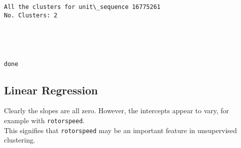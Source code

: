 \documentclass[11pt]{article}
\begin{document}
    \begin{Verbatim}[commandchars=\\\{\}]
All the clusters for unit\_sequence 16775261
No. Clusters: 2

    \end{Verbatim}

    \begin{center}
    \end{center}
    { \hspace*{\fill} \\}
    
    \begin{center}
    \end{center}
    { \hspace*{\fill} \\}
    
    \begin{Verbatim}[commandchars=\\\{\}]
done

    \end{Verbatim}

    \subsection{Linear Regression}\label{linear-regression}

Clearly the slopes are all zero. However, the intercepts appear to vary,
for example with \texttt{rotorspeed}.\\
This signifies that \texttt{rotorspeed} may be an important feature in
unsupervised clustering.
\end{document}

